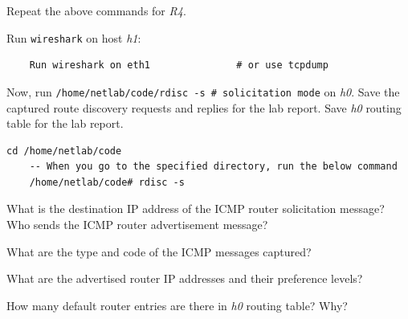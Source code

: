 \documentclass{UTNetLab}
\begin{document}
Repeat the above commands for \textit{R4}.

    Run \lstinline{wireshark} on host \textit{h1}:

    \begin{lstlisting}
    Run wireshark on eth1               # or use tcpdump
    \end{lstlisting}
    
    Now, run \lstinline{/home/netlab/code/rdisc -s # solicitation mode} on \textit{h0}.
    Save the captured route discovery requests and replies for the lab report.
    Save \textit{h0} routing table for the lab report.
    
\begin{lstlisting}[frame=trBL, language=cisco]
    cd /home/netlab/code
    -- When you go to the specified directory, run the below command
    /home/netlab/code# rdisc -s
\end{lstlisting}
    
    \begin{report}
        \item What is the destination IP address of the ICMP router solicitation message? Who sends the ICMP router advertisement message?
        \item What are the type and code of the ICMP messages captured?
        \item What are the advertised router IP addresses and their preference levels?
        \item How many default router entries are there in \textit{h0} routing table? Why?
    \end{report}
\end{document}
